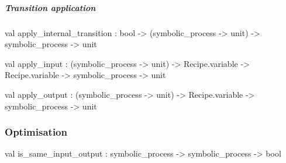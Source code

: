\subparagraph{Transition application}




\label{val:Process.apply-underscoreinternal-underscoretransition}\begin{ocamldoccode}
val apply_internal_transition :
  bool ->
  (symbolic_process -> unit) -> symbolic_process -> unit
\end{ocamldoccode}




\label{val:Process.apply-underscoreinput}\begin{ocamldoccode}
val apply_input :
  (symbolic_process -> unit) ->
  Recipe.variable -> Recipe.variable -> symbolic_process -> unit
\end{ocamldoccode}




\label{val:Process.apply-underscoreoutput}\begin{ocamldoccode}
val apply_output :
  (symbolic_process -> unit) ->
  Recipe.variable -> symbolic_process -> unit
\end{ocamldoccode}




\subsubsection{Optimisation}




\label{val:Process.is-underscoresame-underscoreinput-underscoreoutput}\begin{ocamldoccode}
val is_same_input_output : symbolic_process -> symbolic_process -> bool
\end{ocamldoccode}


